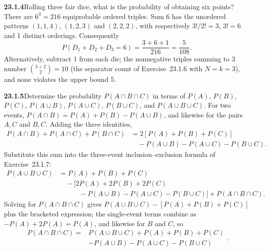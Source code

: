 \par\bigskip
\noindent\textbf{23.1.4}\quad Rolling three fair dice, what is the
probability of obtaining six points?
\solution
There are $6^3=216$ equiprobable ordered triples. Sum 6 has the
unordered patterns $(1,1,4)$, $(1,2,3)$ and $(2,2,2)$, with respectively
$3!/2!=3$, $3!=6$ and 1 distinct orderings. Consequently
\[
\boxed{P(D_1+D_2+D_3=6)=\frac{3+6+1}{216}=\frac5{108}}.
\]
Alternatively, subtract 1 from each die; the nonnegative triples summing
to 3 number $\binom{3+2}{2}=10$ (the separator count of
Exercise~23.1.6 with $N=k=3$), and none violates the upper bound 5.


\par\bigskip
\noindent\textbf{23.1.5}\quad Determine the probability
$P(A\cap B\cap C)$ in terms of $P(A)$, $P(B)$, $P(C)$,
$P(A\cup B)$, $P(A\cup C)$, $P(B\cup C)$, and $P(A\cup B\cup C)$.
\solution
For two events, $P(A\cap B)=P(A)+P(B)-P(A\cup B)$, and likewise for
the pairs $A,C$ and $B,C$. Adding the three identities,
\[
\begin{aligned}
P(A\cap B)+P(A\cap C)+P(B\cap C)
&=2[P(A)+P(B)+P(C)]\\
&\quad-P(A\cup B)-P(A\cup C)-P(B\cup C).
\end{aligned}
\]
Substitute this sum into the three-event inclusion--exclusion formula
of Exercise~23.1.7:
\begin{align*}
P(A\cup B\cup C)
 &=P(A)+P(B)+P(C)\\
 &\quad-[2P(A)+2P(B)+2P(C)\\
 &\qquad\quad-P(A\cup B)-P(A\cup C)-P(B\cup C)]
 +P(A\cap B\cap C).
\end{align*}
Solving for $P(A\cap B\cap C)$ gives
$P(A\cup B\cup C)-[P(A)+P(B)+P(C)]$ plus the bracketed expression; the
single-event terms combine as $-P(A)+2P(A)=P(A)$, and likewise for $B$
and $C$, so
\[
\boxed{\begin{aligned}
P(A\cap B\cap C)={}&P(A\cup B\cup C)+P(A)+P(B)+P(C)\\
 &-P(A\cup B)-P(A\cup C)-P(B\cup C)
\end{aligned}}.
\]


